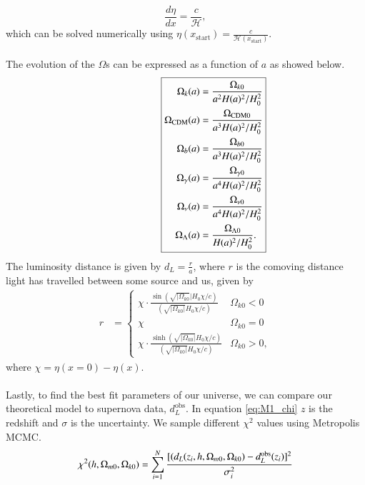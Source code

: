\documentclass{aa}
\begin{document}
\begin{equation}
   \frac{d\eta}{dx} = \frac{c}{\mathcal
   H},
\end{equation}
which can be solved numerically using $\eta(x_\mathrm{start})=\frac{c}{\mathcal{H}(x_\mathrm{start})}$.
\noindent
\\ \\
The evolution of the $\Omega$s can be expressed as a function of $a$ as showed below. 
\begin{equation}
      \hspace*{2cm}
      \boxed{
   \begin{aligned}
      \Omega_{k}(a) &= \frac{\Omega_{k0}}{a^2H(a)^2/H_0^2}\\
      \Omega_{\rm CDM}(a) &= \frac{\Omega_{\rm CDM 0}}{a^3H(a)^2/H_0^2} \\
      \Omega_b(a) &= \frac{\Omega_{b 0}}{a^3H(a)^2/H_0^2} \\
      \Omega_\gamma(a) &= \frac{\Omega_{\gamma 0}}{a^4H(a)^2/H_0^2} \\
      \Omega_{\nu}(a) &= \frac{\Omega_{\nu 0}}{a^4H(a)^2/H_0^2} \\
      \Omega_{\Lambda}(a) &= \frac{\Omega_{\Lambda 0}}{H(a)^2/H_0^2}.
   \end{aligned}
      }
\end{equation}
The luminosity distance is given by $d_L = \frac{r}{a}$, where $r$ is the comoving distance light has travelled between some source and us, given by 
$$
\boxed{
\begin{aligned}
r &= \begin{cases}
\chi \cdot \frac{\sin \left( \sqrt{|\Omega_{k 0}}| H_0 \chi /c \right)}{\left(\sqrt{|\Omega_{k 0}|}H_0\chi / c\right)} & \Omega_{k 0} < 0\\
\chi & \Omega_{k 0} =0 \\
\chi \cdot \frac{\sinh \left( \sqrt{|\Omega_{k 0}|} H_0 \chi / c\right)}{\left(\sqrt{|\Omega_{k 0}|}H_0\chi / c\right) } & \Omega_{k 0} > 0,
\end{cases}
\end{aligned}
}
$$
where $\chi= \eta(x=0)-\eta(x)$.\\
\\
Lastly, to find the best fit parameters of our universe, we can compare our theoretical model to supernova data, $d_L^\mathrm{obs}$. In equation \ref{eq:M1_chi} 
$z$ is the redshift and $\sigma$ is the uncertainty. We sample different $\chi^2$ values using Metropolis MCMC.
\begin{equation} \label{eq:M1_chi}
\chi^2(h,\Omega_{m0}, \Omega_{k0}) = \sum_{i=1}^N \frac{[(d_L(z_i,h,\Omega_{m0},\Omega_{k0}) - d_L^{\rm obs}(z_i)]^2 }{\sigma_i^2}
\end{equation}
\end{document}
